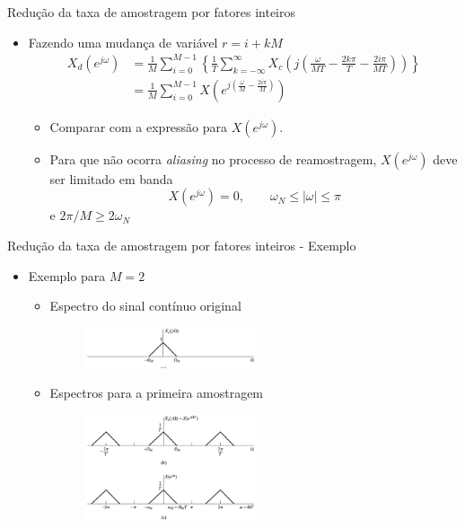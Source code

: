 \begin{slide}{Redução da taxa de amostragem por fatores inteiros}
	\begin{itemize}
		\item Fazendo uma mudança de variável $ r = i + kM$
			\begin{align*}
				X_d(e^{j\omega})& = \frac{1}{M}\sum_{i=0}^{M-1}\left \{\frac{1}{T}\sum_{k=-\infty}^{\infty}X_c\left(j\left(\frac{\omega}{MT}-\frac{2k\pi}{T}-\frac{2i\pi}{MT}\right )\right )\right \}\\
				& = \frac{1}{M}\sum_{i=0}^{M-1}X\left (e^{j\left (\frac{\omega}{M}-\frac{2i\pi}{M}\right )}\right )
			\end{align*}
			\begin{itemize}
				\item Comparar com a expressão para $X(e^{j\omega})$.
				\item Para que não ocorra \emph{aliasing} no processo de reamostragem, $X(e^{j\omega})$ deve ser limitado em banda
					\begin{equation*}
						X(e^{j\omega})= 0, \qquad \omega_N \leq |\omega| \leq \pi
					\end{equation*}
					e  $2\pi/M \geq 2 \omega_N$
			\end{itemize}
	\end{itemize}
\end{slide}

\begin{slide}{Redução da taxa de amostragem por fatores inteiros - Exemplo}
	\begin{itemize}
		\item Exemplo para $M=2$
			\begin{itemize}
				\item Espectro do sinal contínuo original
			\begin{figure}
				\centering
				\includegraphics[width=0.5\textwidth]{figs/4-20a.eps}
		        \end{figure}
		\item Espectros para a primeira amostragem 
			\begin{figure}
				\centering
				\includegraphics[width=0.5\textwidth]{figs/4-20bc.eps}
		        \end{figure}
			\end{itemize}
	\end{itemize}
\end{slide}

